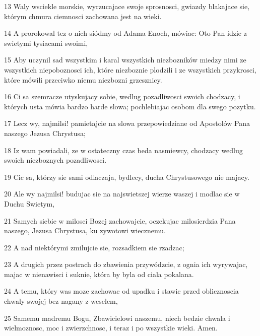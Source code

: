 \par 13 Waly wsciekle morskie, wyrzucajace swoje sprosnosci, gwiazdy blakajace sie, którym chmura ciemnosci zachowana jest na wieki.
\par 14 A prorokowal tez o nich siódmy od Adama Enoch, mówiac: Oto Pan idzie z swietymi tysiacami swoimi,
\par 15 Aby uczynil sad wszystkim i karal wszystkich niezbozników miedzy nimi ze wszystkich niepoboznosci ich, które niezboznie plodzili i ze wszystkich przykrosci, które mówili przeciwko niemu niezbozni grzesznicy.
\par 16 Ci sa szemracze utyskujacy sobie, wedlug pozadliwosci swoich chodzacy, i których usta mówia bardzo harde slowa; pochlebiajac osobom dla swego pozytku.
\par 17 Lecz wy, najmilsi! pamietajcie na slowa przepowiedziane od Apostolów Pana naszego Jezusa Chrystusa;
\par 18 Iz wam powiadali, ze w ostateczny czas beda nasmiewcy, chodzacy wedlug swoich niezboznych pozadliwosci.
\par 19 Cic sa, którzy sie sami odlaczaja, bydlecy, ducha Chrystusowego nie majacy.
\par 20 Ale wy najmilsi! budujac sie na najswietszej wierze waszej i modlac sie w Duchu Swietym,
\par 21 Samych siebie w milosci Bozej zachowajcie, oczekujac milosierdzia Pana naszego, Jezusa Chrystusa, ku zywotowi wiecznemu.
\par 22 A nad niektórymi zmilujcie sie, rozsadkiem sie rzadzac;
\par 23 A drugich przez postrach do zbawienia przywódzcie, z ognia ich wyrywajac, majac w nienawisci i suknie, która by byla od ciala pokalana.
\par 24 A temu, który was moze zachowac od upadku i stawic przed oblicznoscia chwaly swojej bez nagany z weselem,
\par 25 Samemu madremu Bogu, Zbawicielowi naszemu, niech bedzie chwala i wielmoznosc, moc i zwierzchnosc, i teraz i po wszystkie wieki. Amen.


